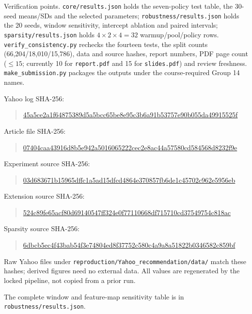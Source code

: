 \documentclass[10pt,a4paper]{article}
\begin{document}
\noindent Verification points. \texttt{core/results.json} holds the seven-policy
test table, the 30-seed means/SDs and the selected parameters;
\texttt{robustness/results.json} holds the 20 seeds, window sensitivity,
intercept ablation and paired intervals; \texttt{sparsity/results.json} holds
$4\times2\times4=32$ warmup/pool/policy rows.
\texttt{verify\_consistency.py} rechecks the fourteen tests, the split counts
(66,204/18,010/15,786), data and source hashes, report numbers, PDF page
count ($\le 15$; currently 10 for \texttt{report.pdf} and 15 for
\texttt{slides.pdf}) and review freshness. \texttt{make\_submission.py} packages
the outputs under the course-required Group 14 names.

\noindent Yahoo log SHA-256:
\begin{quote}\footnotesize\url{45a5ce2a1f64875389d5a5bcc65be8e95c3b6a91b53757e90b055da49915525f}\end{quote}
\noindent Article file SHA-256:
\begin{quote}\footnotesize\url{07404caa43916d8b5e942a5016065222cec2e8ac44a57580cd584568d8232f9e}\end{quote}
\noindent Experiment source SHA-256:
\begin{quote}\footnotesize\url{03d683671b15965dffc1a5ad15dfcd4864e370857fb6de1c45702c962e5956eb}\end{quote}
\noindent Extension source SHA-256:
\begin{quote}\footnotesize\url{524c89fe65acf80d69140547ff324e0f77110668df715710cd37549754c818ac}\end{quote}
\noindent Sparsity source SHA-256:
\begin{quote}\footnotesize\url{6dbcb5ec4f43bab54f3e74804ed8f37752c580c4a9a8a51822b0346582c859bf}\end{quote}

Raw Yahoo files under \texttt{reproduction/Yahoo\_recommendation/data/}
match these hashes; derived figures need no external data. All values are
regenerated by the locked pipeline, not copied from a prior run.

The complete window and feature-map sensitivity table is in
\texttt{robustness/results.json}.
\end{document}
